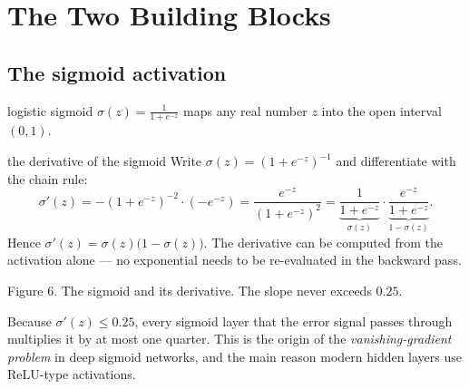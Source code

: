 \documentclass[11pt]{article}
\begin{document}
\section{The Two Building Blocks}
\subsection{The sigmoid activation}
\begin{definition}{logistic sigmoid}
$\displaystyle\sigma(z)=\frac{1}{1+e^{-z}}$ maps any real number $z$ into the open interval $(0,1)$.
\end{definition}

\begin{derivation}{the derivative of the sigmoid}
Write $\sigma(z)=(1+e^{-z})^{-1}$ and differentiate with the chain rule:
\[
\sigma'(z)=-(1+e^{-z})^{-2}\cdot(-e^{-z})=\frac{e^{-z}}{(1+e^{-z})^{2}}
=\underbrace{\frac{1}{1+e^{-z}}}_{\sigma(z)}\cdot\underbrace{\frac{e^{-z}}{1+e^{-z}}}_{1-\sigma(z)} .
\]
Hence $\sigma'(z)=\sigma(z)\bigl(1-\sigma(z)\bigr)$. The derivative can be computed from the activation alone --- no exponential needs to be re-evaluated in the backward pass.
\end{derivation}

\begin{center}

\small Figure 6. The sigmoid and its derivative. The slope never exceeds $0.25$.
\end{center}

\begin{keypoint}Because $\sigma'(z)\le 0.25$, every sigmoid layer that the error signal passes through multiplies it by at most one quarter. This is the origin of the \emph{vanishing-gradient problem} in deep sigmoid networks, and the main reason modern hidden layers use ReLU-type activations.\end{keypoint}
\end{document}
